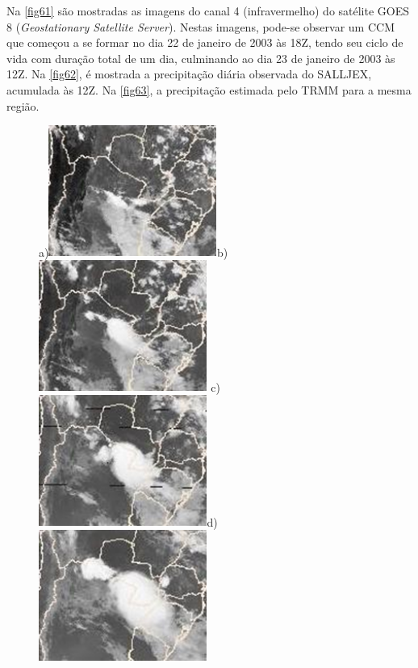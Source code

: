 Na \autoref{fig61} são mostradas as imagens do canal 4 (infravermelho) do satélite GOES 8 (\textit{Geostationary Satellite Server}). Nestas imagens, pode-se observar um CCM que começou a se formar no dia 22 de janeiro de 2003 às 18Z, tendo seu ciclo de vida com duração total de um dia, culminando ao dia 23 de janeiro de 2003 às 12Z. Na \autoref{fig62}, é mostrada a precipitação diária observada do SALLJEX, acumulada às 12Z. Na \autoref{fig63}, a precipitação estimada pelo TRMM para a mesma região.

\begin{figure}
\centering
a)\includegraphics[height=4.3cm]{./figs/sat01.png}\hspace{0.2cm}b)\includegraphics[height=4.3cm]{./figs/sat02.png}\hspace{0.2cm}
c)\includegraphics[height=4.3cm]{./figs/sat03.png}\hspace{0.2cm}d)\includegraphics[height=4.3cm]{./figs/sat04.png}

\end{figure}
